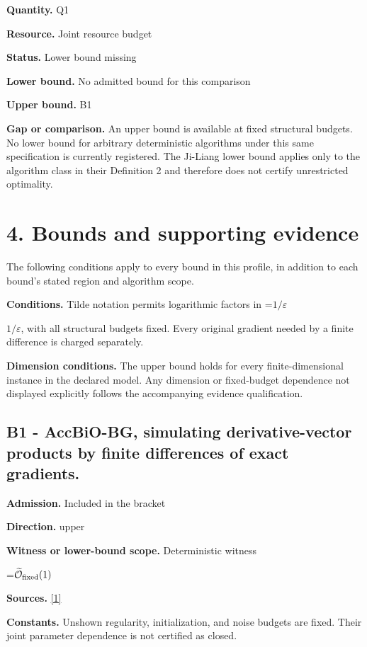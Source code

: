 \documentclass[10pt,a4paper]{article}
\newcommand{\AtlasMath}[1]{\par\begingroup\centering\setbox0=\hbox{$\displaystyle #1$}\ifdim\wd0>1.4\linewidth\typeout{ATLAS WIDE FORMULA: \the\wd0}\fi\ifdim\wd0>\linewidth\resizebox{\linewidth}{!}{\box0}\else\box0\fi\par\endgroup}
\newcommand{\AtlasInlineMath}[1]{\begingroup\setbox0=\hbox{$#1$}\ifdim\wd0>.4\linewidth\endgroup\AtlasMath{#1}\else\endgroup$#1$\fi}
\begin{document}
\textbf{Quantity.} Q1

\textbf{Resource.} Joint resource budget

\textbf{Status.} Lower bound missing

\textbf{Lower bound.} No admitted bound for this comparison

\textbf{Upper bound.} B1

\textbf{Gap or comparison.} An upper bound is available at fixed structural budgets. No lower bound for arbitrary deterministic algorithms under this same specification is currently registered. The Ji-Liang lower bound applies only to the algorithm class in their Definition 2 and therefore does not certify unrestricted optimality.

\section{4. Bounds and supporting evidence}
The following conditions apply to every bound in this profile, in addition to each bound's stated region and algorithm scope.

\textbf{Conditions.} Tilde notation permits logarithmic factors in \AtlasInlineMath{1/\varepsilon}, with all structural budgets fixed. Every original gradient needed by a finite difference is charged separately.

\textbf{Dimension conditions.} The upper bound holds for every finite-dimensional instance in the declared model. Any dimension or fixed-budget dependence not displayed explicitly follows the accompanying evidence qualification.

\subsection{B1 - AccBiO-BG, simulating derivative-vector products by finite differences of exact gradients.}
\textbf{Admission.} Included in the bracket

\textbf{Direction.} upper

\textbf{Witness or lower-bound scope.} Deterministic witness

\AtlasMath{\widetilde{\mathcal{O}}_{\rm fixed}(1)}
\textbf{Sources.} \href{https://www.jmlr.org/papers/volume24/21-0949/21-0949.pdf}{[1]}

\textbf{Constants.} Unshown regularity, initialization, and noise budgets are fixed. Their joint parameter dependence is not certified as closed.
\end{document}

